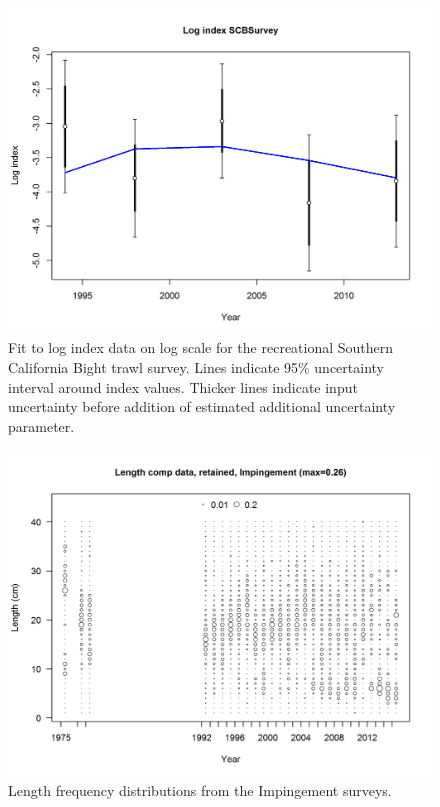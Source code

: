 \documentclass[12pt,]{article}
\begin{document}
\FloatBarrier

\begin{figure}[htbp]
\centering
\includegraphics{r4ss/plots_mod1/index5_logcpuefit_SCBSurvey.png}
\caption{Fit to log index data on log scale for the recreational
Southern California Bight trawl survey. Lines indicate 95\% uncertainty
interval around index values. Thicker lines indicate input uncertainty
before addition of estimated additional uncertainty parameter.
\label{fig:index5_logcpuefit_SCBSurvey}}
\end{figure}

\begin{figure}[htbp]
\centering
\includegraphics{r4ss/plots_mod1/comp_lendat_bubflt10mkt2.png}
\caption{Length frequency distributions from the Impingement surveys.
\label{fig:Fleet10_comp_lendat_bubflt10mkt2}}
\end{figure}
\end{document}
